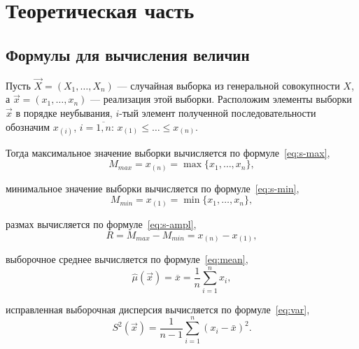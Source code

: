 \section{Теоретическая часть}
\subsection{Формулы для вычисления величин}
Пусть \( \vec{X} = (X_1, \ldots, X_n) \) --- случайная выборка из генеральной
совокупности \( X \), а \( \vec{x} = (x_1, \ldots, x_n) \) --- реализация этой выборки.
Расположим элементы выборки \( \vec{x} \) в порядке неубывания, \( i \)-тый элемент 
полученной последовательности обозначим \( x_{(i)} \), \( i = \overline{1, n} \): 
\( x_{(1)} \leq \dots \leq x_{(n)} \).

Тогда максимальное значение выборки вычисляется по формуле~\ref{eq:s-max},
\begin{equation} \label{eq:s-max}
    M_{max} = x_{(n)} = \max\{x_1, \ldots, x_n\},
\end{equation}

минимальное значение выборки вычисляется по формуле~\ref{eq:s-min},
\begin{equation} \label{eq:s-min}
    M_{min} = x_{(1)} = \min\{x_1, \ldots, x_n\},
\end{equation}

размах вычисляется по формуле~\ref{eq:s-ampl},
\begin{equation} \label{eq:s-ampl}
    R = M_{max} - M_{min} = x_{(n)} - x_{(1)},
\end{equation}

выборочное среднее вычисляется по формуле~\ref{eq:mean},
\begin{equation} \label{eq:mean}
    \hat{\mu}(\vec{x}) = \overline{x} = \frac{1}{n}\sum_{i=1}^{n}x_i,
\end{equation}

исправленная выборочная дисперсия вычисляется по формуле~\ref{eq:var},
\begin{equation} \label{eq:var}
    S^2(\vec{x}) = \frac{1}{n-1}\sum_{i=1}^{n}(x_i - \bar{x} )^2.
\end{equation}

